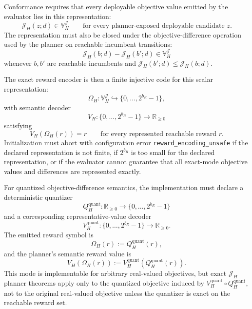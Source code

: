\documentclass[11pt]{article}
\begin{document}
Conformance requires that every deployable objective value emitted by the
evaluator lies in this representation:
\[
\mathcal{J}_H(z;d)\in\mathbb{V}_H^{\mathcal J}
\qquad
\text{for every planner-exposed deployable candidate }z.
\]
The representation must also be closed under the objective-difference operation
used by the planner on reachable incumbent transitions:
\[
\mathcal{J}_H(b;d)-\mathcal{J}_H(b';d)\in\mathbb{V}_H^{\mathcal J}
\]
whenever $b,b'$ are reachable incumbents and
$\mathcal{J}_H(b';d)\le \mathcal{J}_H(b;d)$.

The exact reward encoder is then a finite injective code for this scalar
representation:
\[
\Omega_H:\mathbb{V}_H^{\mathcal J}\hookrightarrow
\{0,\dots,2^{b_R}-1\},
\]
with semantic decoder
\[
V_H:\{0,\dots,2^{b_R}-1\}\to\mathbb{R}_{\ge 0}
\]
satisfying
\[
V_H(\Omega_H(r))=r
\qquad
\text{for every represented reachable reward }r.
\]
Initialization must abort with configuration error
\texttt{reward\_encoding\_unsafe} if the declared representation is not finite,
if $2^{b_R}$ is too small for the declared representation, or if the evaluator
cannot guarantee that all exact-mode objective values and differences are
represented exactly.

For quantized objective-difference semantics, the implementation must declare
a deterministic quantizer
\[
Q_H^{\mathrm{quant}}:\mathbb{R}_{\ge 0}\to\{0,\dots,2^{b_R}-1\}
\]
and a corresponding representative-value decoder
\[
V_H^{\mathrm{quant}}:\{0,\dots,2^{b_R}-1\}\to\mathbb{R}_{\ge 0}.
\]
The emitted reward symbol is
\[
\Omega_H(r):=Q_H^{\mathrm{quant}}(r),
\]
and the planner's semantic reward value is
\[
V_H(\Omega_H(r)):=V_H^{\mathrm{quant}}(Q_H^{\mathrm{quant}}(r)).
\]
This mode is implementable for arbitrary real-valued objectives, but exact
$\mathcal{J}_H$ planner theorems apply only to the quantized objective induced
by $V_H^{\mathrm{quant}}\circ Q_H^{\mathrm{quant}}$, not to the original
real-valued objective unless the quantizer is exact on the reachable reward set.
\end{document}
